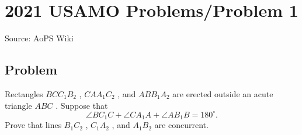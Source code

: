 \documentclass[12pt]{article}
\begin{document}
\section*{{2021 USAMO Problems/Problem 1}}
Source: AoPS Wiki

\subsection*{Problem}
Rectangles $BCC_{1}B_{2}$ , $CAA_{1}C_{2}$ , and $ABB_{1}A_{2}$ are erected outside an acute triangle $ABC$ . Suppose that \[\angle BC_{1}C + \angle CA_{1}A + \angle AB_{1}B = 180^{\circ}.\] Prove that lines $B_{1}C_{2}$ , $C_{1}A_{2}$ , and $A_{1}B_{2}$ are concurrent.
\end{document}
